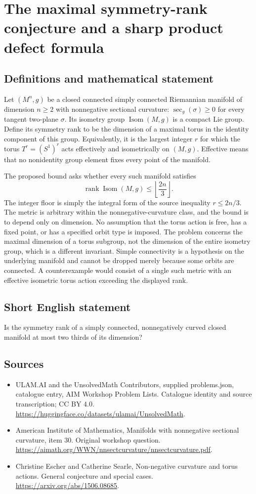 \documentclass[11pt,a4paper]{article}
\begin{document}
\section*{The maximal symmetry-rank conjecture and a sharp product defect formula}\label{statement}

\subsection{Definitions and mathematical statement}
Let $(M^n,g)$ be a closed connected simply connected Riemannian manifold of dimension $n\geq2$ with nonnegative sectional curvature:
$\sec_g(\sigma)\geq0$ for every tangent two-plane $\sigma$.
Its isometry group $\operatorname{Isom}(M,g)$ is a compact Lie group.
Define its symmetry rank to be the dimension of a maximal torus in the identity component of this group.
Equivalently, it is the largest integer $r$ for which the torus $T^r=(S^1)^r$ acts effectively and isometrically on $(M,g)$.
Effective means that no nonidentity group element fixes every point of the manifold.

The proposed bound asks whether every such manifold satisfies
\[
 \operatorname{rank}\operatorname{Isom}(M,g)
          \leq\left\lfloor\frac{2n}{3}\right\rfloor.
\]
The integer floor is simply the integral form of the source inequality $r\leq2n/3$.
The metric is arbitrary within the nonnegative-curvature class, and the bound is to depend only on dimension.
No assumption that the torus action is free, has a fixed point, or has a specified orbit type is imposed.
The problem concerns the maximal dimension of a torus subgroup, not the dimension of the entire isometry group, which is a different invariant.
Simple connectivity is a hypothesis on the underlying manifold and cannot be dropped merely because some orbits are connected.
A counterexample would consist of a single such metric with an effective isometric torus action exceeding the displayed rank.
\subsection{Short English statement}
Is the symmetry rank of a simply connected, nonnegatively curved closed manifold at most two thirds of its dimension?
\subsection{Sources}
\begin{itemize}
\item[S1] ULAM.AI and the UnsolvedMath Contributors, supplied problems.json, catalogue entry, AIM Workshop Problem Lists. Catalogue identity and source transcription; CC BY 4.0.
\url{https://huggingface.co/datasets/ulamai/UnsolvedMath}.
\item[S2] American Institute of Mathematics, Manifolds with nonnegative sectional curvature, item 30. Original workshop question.
\url{https://aimath.org/WWN/nnsectcurvature/nnsectcurvature.pdf}.
\item[S3] Christine Escher and Catherine Searle, Non-negative curvature and torus actions. General conjecture and special cases.
\url{https://arxiv.org/abs/1506.08685}.
\end{itemize}
\end{document}
